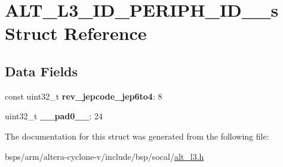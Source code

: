 \hypertarget{structALT__L3__ID__PERIPH__ID__2__s}{}\section{A\+L\+T\+\_\+\+L3\+\_\+\+I\+D\+\_\+\+P\+E\+R\+I\+P\+H\+\_\+\+I\+D\+\_\+\_\+s Struct Reference}
\label{structALT__L3__ID__PERIPH__ID__2__s}
\subsection*{Data Fields}
\begin{DoxyCompactItemize}
\item 
\mbox{\label{structALT__L3__ID__PERIPH__ID__2__s_a5efe2df1bcf99464c8a6799406da7e00}} 
const uint32\+\_\+t {\bfseries rev\+\_\+jepcode\+\_\+jep6to4}\+: 8
\item 
\mbox{\label{structALT__L3__ID__PERIPH__ID__2__s_a54526fb69280e561f2aceb8efb6bf328}} 
uint32\+\_\+t {\bfseries \+\_\+\+\_\+pad0\+\_\+\+\_\+}\+: 24
\end{DoxyCompactItemize}


The documentation for this struct was generated from the following file\+:\begin{DoxyCompactItemize}
\item 
bsps/arm/altera-\/cyclone-\/v/include/bsp/socal/\mbox{\hyperlink{alt__l3_8h}{alt\+\_\+l3.\+h}}\end{DoxyCompactItemize}
